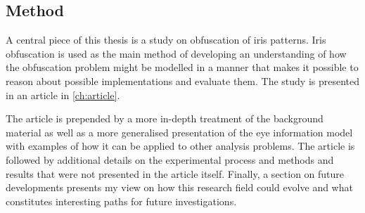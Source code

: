 \subsection*{Method}
A central piece of this thesis is a study on obfuscation of iris patterns. Iris obfuscation is used as the main method of developing an understanding of how the obfuscation problem might be modelled in a manner that makes it possible to reason about possible implementations and evaluate them. The study is presented in an article in \cref{ch:article}. 

The article is prepended by a more in-depth treatment of the background material as well as a more generalised presentation of the eye information model with examples of how it can be applied to other analysis problems. The article is followed by additional details on the experimental process and methods and results that were not presented in the article itself. Finally, a section on future developments presents my view on how this research field could evolve and what constitutes interesting paths for future investigations.






























